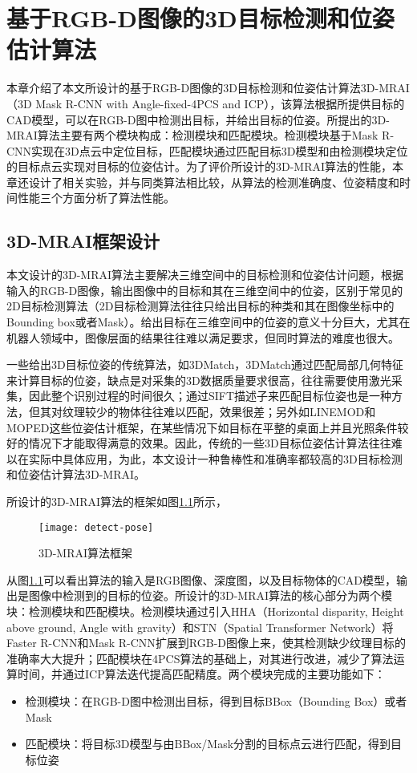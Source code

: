 \chapter{基于RGB-D图像的3D目标检测和位姿估计算法}
\label{chap:pose}
本章介绍了本文所设计的基于RGB-D图像的3D目标检测和位姿估计算法3D-MRAI（3D Mask R-CNN with Angle-fixed-4PCS and ICP），该算法根据所提供目标的CAD模型，可以在RGB-D图中检测出目标，并给出目标的位姿。所提出的3D-MRAI算法主要有两个模块构成：检测模块和匹配模块。检测模块基于Mask R-CNN\cite{He2017}实现在3D点云中定位目标，匹配模块通过匹配目标3D模型和由检测模块定位的目标点云实现对目标的位姿估计。为了评价所设计的3D-MRAI算法的性能，本章还设计了相关实验，并与同类算法相比较，从算法的检测准确度、位姿精度和时间性能三个方面分析了算法性能。

\section{3D-MRAI框架设计}
本文设计的3D-MRAI算法主要解决三维空间中的目标检测和位姿估计问题，根据输入的RGB-D图像，输出图像中的目标和其在三维空间中的位姿，区别于常见的2D目标检测算法（2D目标检测算法往往只给出目标的种类和其在图像坐标中的Bounding box或者Mask）。给出目标在三维空间中的位姿的意义十分巨大，尤其在机器人领域中，图像层面的结果往往难以满足要求，但同时算法的难度也很大。

一些给出3D目标位姿的传统算法，如3DMatch\cite{zeng20163dmatch}，3DMatch通过匹配局部几何特征来计算目标的位姿，缺点是对采集的3D数据质量要求很高，往往需要使用激光采集，因此整个识别过程的时间很久；通过SIFT描述子来匹配目标位姿\cite{dias2015sift}也是一种方法，但其对纹理较少的物体往往难以匹配，效果很差；另外如LINEMOD\cite{hinterstoisser2012gradient}和MOPED\cite{collet2011moped}这些位姿估计框架，在某些情况下如目标在平整的桌面上并且光照条件较好的情况下才能取得满意的效果。因此，传统的一些3D目标位姿估计算法往往难以在实际中具体应用，为此，本文设计一种鲁棒性和准确率都较高的3D目标检测和位姿估计算法3D-MRAI。

所设计的3D-MRAI算法的框架如图\ref{fig:detect-pose}所示，
\begin{figure}[ht]
  \centering
  \texttt{[image: detect-pose]}
  \caption{3D-MRAI算法框架}
  \label{fig:detect-pose}
\end{figure}
从图\ref{fig:detect-pose}可以看出算法的输入是RGB图像、深度图，以及目标物体的CAD模型，输出是图像中检测到的目标的位姿。所设计的3D-MRAI算法的核心部分为两个模块：检测模块和匹配模块。检测模块通过引入HHA（Horizontal disparity, Height above ground, Angle with gravity）和STN（Spatial Transformer Network）将Faster R-CNN\cite{Ren}和Mask R-CNN\cite{He2017}扩展到RGB-D图像上来，使其检测缺少纹理目标的准确率大大提升；匹配模块在4PCS算法\cite{aiger20084}的基础上，对其进行改进，减少了算法运算时间，并通过ICP算法\cite{besl1992method}迭代提高匹配精度。两个模块完成的主要功能如下：
\begin{itemize}
\item {\kai 检测模块}：在RGB-D图中检测出目标，得到目标BBox（Bounding Box）或者Mask
\item {\kai 匹配模块}：将目标3D模型与由BBox/Mask分割的目标点云进行匹配，得到目标位姿
\end{itemize}

